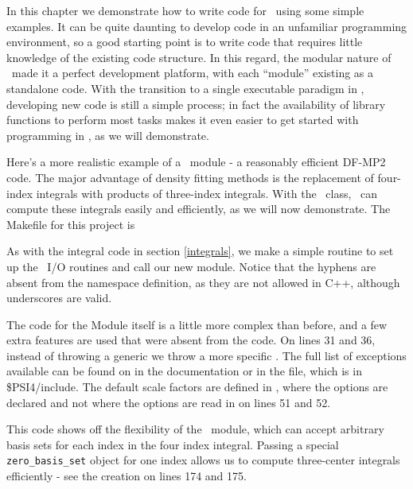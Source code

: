 In this chapter we demonstrate how to write code for \PSIfour\ using some simple
examples.  It can be quite daunting to develop code in an unfamiliar programming
environment, so a good starting point is to write code that requires little
knowledge of the existing code structure.  In this regard, the modular nature
of \PSIthree\ made it a perfect development platform, with each ``module''
existing as a standalone code.  With the transition to a single executable
paradigm in \PSIfour, developing new code is still a simple process; in fact
the availability of library functions to perform most tasks makes it even
easier to get started with programming in \PSIfour, as we will demonstrate.

Here's a more realistic example of a \PSIfour\ module - a reasonably efficient
DF-MP2 code.  The major advantage of density fitting methods is the replacement
of four-index integrals with products of three-index integrals.  With the
\libmints\ class, \PSIfour\ can compute these integrals easily and efficiently,
as we will now demonstrate.  The Makefile for this project is


As with the integral code in section \ref{integrals}, we make a simple
 routine to set up the \PSI\ I/O routines and call our new module.
Notice that the hyphens are absent from the namespace definition, as they are
not allowed in C++, although underscores are valid.


The code for the Module itself is a little more complex than before, and a few
extra features are used that were absent from the  code.  On
lines 31 and 36, instead of throwing a generic  we throw a
more specific .  The full list of exceptions available
can be found on in the  documentation or in the
 file, which is in \$PSI4/include.  The default scale
factors are defined in , where the options are declared and not
where the options are read in on lines 51 and 52.

This code shows off the flexibility of the \libmints\ module, which can accept
arbitrary basis sets for each index in the four index integral.  Passing a
special {\tt zero\_basis\_set} object for one index allows us to compute
three-center integrals efficiently - see the  creation
on lines 174 and 175.  

